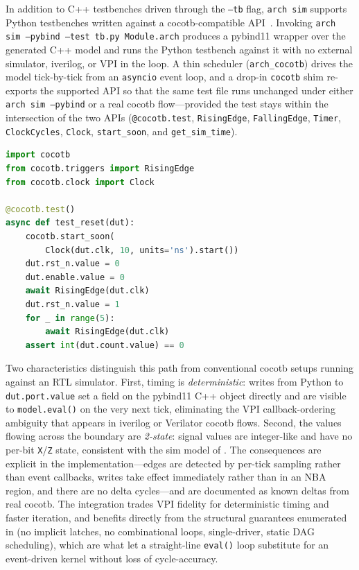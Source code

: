\documentclass[manuscript]{acmart}
\begin{document}
In addition to C++ testbenches driven through the \texttt{--tb} flag, \texttt{arch sim} supports Python testbenches written against a cocotb-compatible API~\cite{cocotb}. Invoking \texttt{arch sim --pybind --test tb.py Module.arch} produces a pybind11 wrapper over the generated C++ model and runs the Python testbench against it with no external simulator, iverilog, or VPI in the loop. A thin scheduler (\texttt{arch\_cocotb}) drives the model tick-by-tick from an \texttt{asyncio} event loop, and a drop-in \texttt{cocotb} shim re-exports the supported API so that the same test file runs unchanged under either \texttt{arch sim --pybind} or a real cocotb flow---provided the test stays within the intersection of the two APIs (\texttt{@cocotb.test}, \texttt{RisingEdge}, \texttt{FallingEdge}, \texttt{Timer}, \texttt{ClockCycles}, \texttt{Clock}, \texttt{start\_soon}, and \texttt{get\_sim\_time}).

\begin{lstlisting}[language=Python,caption={Python testbench against \texttt{arch sim}},label={lst:cocotbtb}]
import cocotb
from cocotb.triggers import RisingEdge
from cocotb.clock import Clock

@cocotb.test()
async def test_reset(dut):
    cocotb.start_soon(
        Clock(dut.clk, 10, units='ns').start())
    dut.rst_n.value = 0
    dut.enable.value = 0
    await RisingEdge(dut.clk)
    dut.rst_n.value = 1
    for _ in range(5):
        await RisingEdge(dut.clk)
    assert int(dut.count.value) == 0
\end{lstlisting}

Two characteristics distinguish this path from conventional cocotb setups running against an RTL simulator. First, timing is \emph{deterministic}: writes from Python to \texttt{dut.port.value} set a field on the pybind11 C++ object directly and are visible to \texttt{model.eval()} on the very next tick, eliminating the VPI callback-ordering ambiguity that appears in iverilog or Verilator cocotb flows. Second, the values flowing across the boundary are \emph{2-state}: signal values are integer-like and have no per-bit \texttt{X}/\texttt{Z} state, consistent with the sim model of . The consequences are explicit in the implementation---edges are detected by per-tick sampling rather than event callbacks, writes take effect immediately rather than in an NBA region, and there are no delta cycles---and are documented as known deltas from real cocotb. The integration trades VPI fidelity for deterministic timing and faster iteration, and benefits directly from the structural guarantees enumerated in  (no implicit latches, no combinational loops, single-driver, static DAG scheduling), which are what let a straight-line \texttt{eval()} loop substitute for an event-driven kernel without loss of cycle-accuracy.
\end{document}
